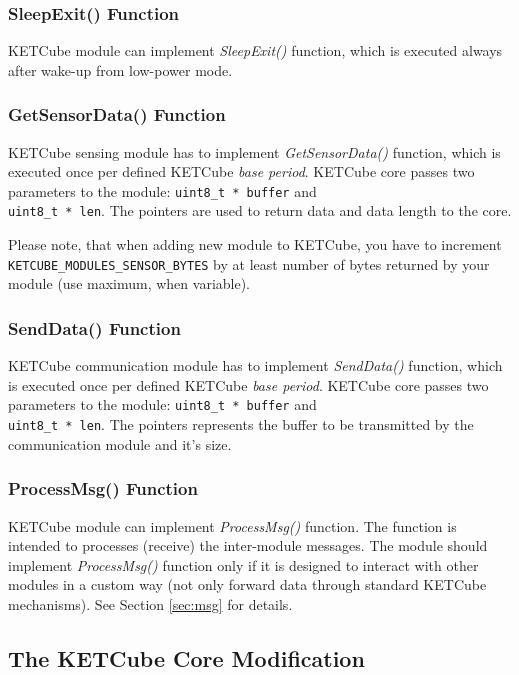 \documentclass[twoside,a4paper]{refart}
\begin{document}
\subsubsection*{SleepExit() Function}
KETCube module can implement {\it SleepExit()} function, which is executed always after wake-up from low-power mode.

\subsubsection*{GetSensorData() Function}
KETCube sensing module has to implement {\it GetSensorData()} function, which is executed once per defined KETCube {\it base period}. KETCube core passes two parameters to the module: {\tt uint8\_t * buffer} and\\{\tt uint8\_t * len}. The pointers are used to return data and data length to the core.

Please note, that when adding new module to KETCube, you have to increment {\tt KETCUBE\_MODULES\_SENSOR\_BYTES} by at least number of bytes returned by your module (use maximum, when variable).

\subsubsection*{SendData() Function}
KETCube communication module has to implement {\it SendData()} function, which is executed once per defined KETCube {\it base period}. KETCube core passes two parameters to the module: {\tt uint8\_t * buffer} and\\{\tt uint8\_t * len}. The pointers represents the buffer to be transmitted by the communication module and it's size.

\subsubsection*{ProcessMsg() Function}
KETCube module can implement {\it ProcessMsg()} function. The function is intended to processes (receive) the inter-module messages. The module should implement {\it ProcessMsg()} function only if it is designed to interact with other modules in a custom way (not only forward data through standard KETCube mechanisms). See Section \ref{sec:msg} for details.

\clearpage
\subsection{The KETCube Core Modification}\label{sec:creation:core}
\end{document}
